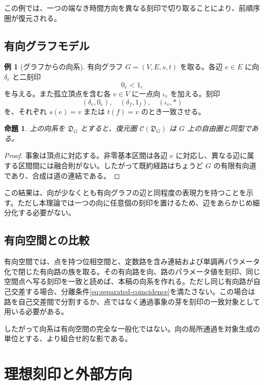 \documentclass[a4paper,11pt]{ltjsarticle}
\theoremstyle{definition}
\newtheorem{example}[definition]{例}
\theoremstyle{plain}
\newtheorem{proposition}[definition]{命題}
\begin{document}
この例では、一つの端なき時間方向を異なる刻印で切り取ることにより、前順序圏が復元される。

\subsection{有向グラフモデル}

\begin{example}[グラフからの向系]
有向グラフ $G=(V,E,s,t)$ を取る。各辺 $e\in E$ に向 $\delta_e$ と二刻印
\[
 0_e<1_e
\]
を与える。また孤立頂点を含む各 $v\in V$ に一点向 $\iota_v$ を加える。刻印
\[
 (\delta_e,0_e),\quad
 (\delta_f,1_f),\quad
 (\iota_v,*)
\]
を、それぞれ $s(e)=v$ または $t(f)=v$ のとき一致させる。
\end{example}

\begin{proposition}
上の向系を $\mathfrak D_G$ とすると、復元圏 $\mathcal C(\mathfrak D_G)$ は $G$ 上の自由圏と同型である。
\end{proposition}

\begin{proof}
事象は頂点に対応する。非零基本区間は各辺 $e$ に対応し、異なる辺に属する区間間には融合則がない。したがって既約経路はちょうど $G$ の有限有向道であり、合成は道の連結である。
\end{proof}

この結果は、向が少なくとも有向グラフの辺と同程度の表現力を持つことを示す。ただし本理論では一つの向に任意個の刻印を置けるため、辺をあらかじめ細分化する必要がない。

\subsection{有向空間との比較}

有向空間では、点を持つ位相空間と、定数路を含み連結および単調再パラメータ化で閉じた有向路の族を取る\cite{Grandis2003Directed}。その有向路を向、路のパラメータ値を刻印、同じ空間点へ写る刻印を一致と読めば、本稿の向系を作れる。ただし同じ有向路が自己交差する場合、分離条件\eqref{eq:separated-coincidence}を満たさない。この場合は路を自己交差間で分割するか、点ではなく通過事象の芽を刻印の一致対象として用いる必要がある。

したがって向系は有向空間の完全な一般化ではない。向の局所通過を対象生成の単位とする、より組合せ的な影である。

\section{理想刻印と外部方向}
\end{document}

